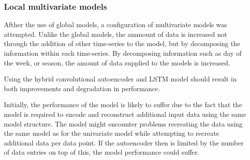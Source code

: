 %
%





\subsubsection{Local multivariate models}

Afther the use of global models, a configuration of multivariate models was attempted.
Unlike the global models, the ammount of data is increased not through the addition of other time-series to the model,
but by decomposing the information within each time-series.
By decomposing information such as day of the week, or season, the amount of data supplied to the models is increased.


Using the hybrid convolutional autoencoder and LSTM model should result in both improvements and degradation in performance.

Initially, the performance of the model is likely to suffer due to the fact that
the model is required to encode and reconstruct additional input data using the same model structure.
The model might encounter problems recreating the data using the same model as for the univariate model
while attempting to recreate additional data per data point.
If the autoencoder then is limited by the number of data entries on top of this, the model performance could suffer.

